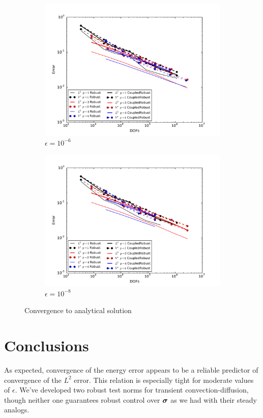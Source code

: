 \documentclass{article}
\begin{document}
\begin{figure}[ht]
\begin{subfigure}[t]{0.45\textwidth}
\includegraphics[width=\textwidth]{Confusion/Robustness/convergence_epsilon=1e-6.pdf}
\caption{$\epsilon=10^{-6}$}
\end{subfigure}
\begin{subfigure}[t]{0.45\textwidth}
\centering
\includegraphics[width=\textwidth]{Confusion/Robustness/convergence_epsilon=1e-8.pdf}
\caption{$\epsilon=10^{-8}$}
\end{subfigure}
\caption{Convergence to analytical solution}
\label{fig:robustConvergence}
\end{figure}


\section{Conclusions}
As expected, convergence of the energy error appears to be a reliable predictor of convergence of the $L^2$ error. 
This relation is especially tight for moderate values of $\epsilon$. 
We've developed two robust test norms for transient convection-diffusion, though neither one guarantees robust control over $\boldsymbol\sigma$ as we had
with their steady analogs. 

 

\end{document}
